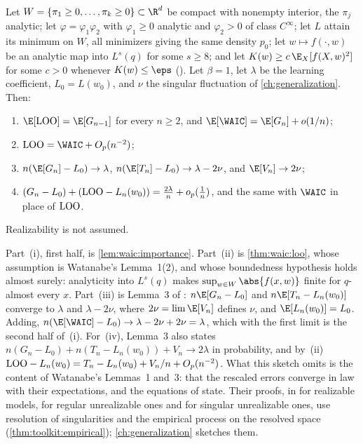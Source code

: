 \begin{refsection}
\begin{theorem}\label{thm:waic:main}
Let $W=\{\pi_1\ge0,\dots,\pi_k\ge0\}\subset\R^d$ be compact with nonempty interior, the $\pi_j$ analytic; let $\varphi=\varphi_1\varphi_2$ with $\varphi_1\ge0$ analytic and $\varphi_2>0$ of class $C^\infty$; let $L$ attain its minimum on $W$, all minimizers giving the same density $p_0$; let $w\mapsto f(\cdot,w)$ be an analytic map into $L^s(q)$ for some $s\ge8$; and let $K(w)\ge c\,\E_X[f(X,w)^2]$ for some $c>0$ whenever $K(w)\le\eps$ (). Let $\beta=1$, let $\lambda$ be the learning coefficient, $L_0=L(w_0)$, and $\nu$ the singular fluctuation of \cref{ch:generalization}. Then:
\begin{enumerate}
\item $\E[\waicLOO]=\E[G_{n-1}]$ for every $n\ge2$, and $\E[\WAIC]=\E[G_n]+o(1/n)$;
\item $\waicLOO=\WAIC+O_p(n^{-2})$;
\item $n(\E[G_n]-L_0)\to\lambda$, $n(\E[T_n]-L_0)\to\lambda-2\nu$, and $\E[V_n]\to2\nu$;
\item $(G_n-L_0)+(\mathrm{LOO}-L_n(w_0))=\frac{2\lambda}n+o_p(\frac1n)$, and the same with $\WAIC$ in place of $\mathrm{LOO}$.
\end{enumerate}
Realizability is not assumed.
\end{theorem}

\begin{proofsketch}
Part~(i), first half, is \cref{lem:waic:importance}. Part~(ii) is \cref{thm:waic:loo}, whose assumption is Watanabe's Lemma~1(2), and whose boundedness hypothesis holds almost surely: analyticity into $L^s(q)$ makes $\sup_{w\in W}\abs{f(x,w)}$ finite for $q$-almost every $x$. Part~(iii) is Lemma~3 of \textcite{Watanabe2010}: $n\E[G_n-L_0]$ and $n\E[T_n-L_n(w_0)]$ converge to $\lambda$ and $\lambda-2\nu$, where $2\nu=\lim\E[V_n]$ defines $\nu$, and $\E[L_n(w_0)]=L_0$. Adding, $n(\E[\WAIC]-L_0)\to\lambda-2\nu+2\nu=\lambda$, which with the first limit is the second half of~(i). For~(iv), Lemma~3 also states $n(G_n-L_0)+n(T_n-L_n(w_0))+V_n\to2\lambda$ in probability, and by~(ii) $\mathrm{LOO}-L_n(w_0)=T_n-L_n(w_0)+V_n/n+O_p(n^{-2})$. What this sketch omits is the content of Watanabe's Lemmas~1 and~3: that the rescaled errors converge in law with their expectations, and the equations of state. Their proofs, in \textcite{Watanabe2010a} for realizable models, \textcite{Watanabe2010b} for regular unrealizable ones and \textcite{Watanabe2010d} for singular unrealizable ones, use resolution of singularities and the empirical process on the resolved space (\cref{thm:toolkit:empirical}); \cref{ch:generalization} sketches them.
\end{proofsketch}


\end{refsection}

